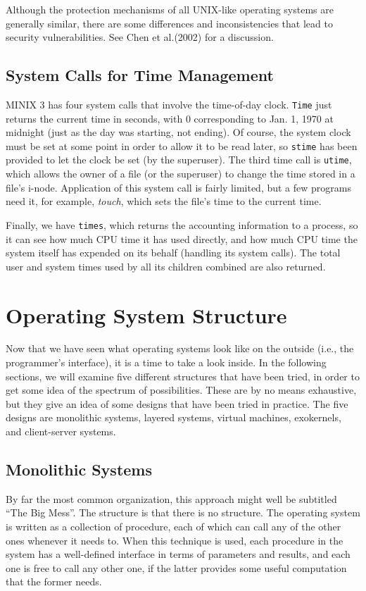 \documentclass{book}
\newcommand {\sys} [1] {\textsl{#1}}
\newcommand {\cmd} [1] {\texttt{#1}}
\begin{document}
Although the protection mechanisms of all UNIX-like operating systems are generally similar, 
there are some differences and inconsistencies that lead to security vulnerabilities.
See Chen et al.(2002) for a discussion.

\subsection{System Calls for Time Management}
MINIX 3 has four system calls that involve the time-of-day clock.
\cmd{Time} just returns the current time in seconds, with 0 corresponding to Jan. 1, 1970 at midnight (just as the day was starting, not ending).
Of course, the system clock must be set at some point in order to allow it to be read later,
so \cmd{stime} has been provided to let the clock be set (by the superuser).
The third time call is \cmd{utime}, which allows the owner of a file (or the superuser) to change the time stored in a file's i-node.
Application of this system call is fairly limited, but a few programs need it, 
for example, \sys{touch}, which sets the file's time to the current time.

Finally, we have \cmd{times}, which returns the accounting information to a process,
so it can see how much CPU time it has used directly, 
and how much CPU time the system itself has expended on its behalf (handling its system calls).
The total user and system times used by all its children combined are also returned.

\section{Operating System Structure}
Now that we have seen what operating systems look like on the outside (i.e., the programmer's interface),
it is a time to take a look inside.
In the following sections, we will examine five different structures that have been tried,
in order to get some idea of the spectrum of possibilities.
These are by no means exhaustive, but they give an idea of some designs that have been tried in practice.
The five designs are monolithic systems, layered systems, virtual machines, exokernels, and client-server systems.

\subsection{Monolithic Systems}
By far the most common organization, this approach might well be subtitled ``The Big Mess''.
The structure is that there is no structure.
The operating system is written as a collection of procedure, each of which can call any of the other ones whenever it needs to.
When this technique is used, each procedure in the system has a well-defined interface in terms of parameters and results,
and each one is free to call any other one, if the latter provides some useful computation that the former needs.
\end{document}
